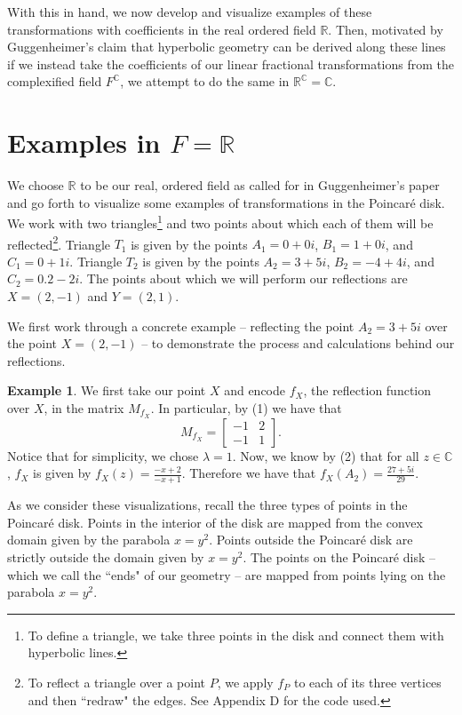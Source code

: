 \documentclass[12pt]{article}
\newcommand{\R}{\mathbb{R}}
\newcommand{\C}{\mathbb{C}}
\newcommand{\fc}{F^{\C}}
\newcommand{\lftmat}[4]{\begin{bmatrix} {#1} & {#2} \\ {#3} & {#4} \end{bmatrix}}
\newcommand{\poincare}{Poincar\'{e} }
\theoremstyle{plain}
\theoremstyle{definition}
\newtheorem{example}[definition]{Example}
\newcommand{\todo}[1]{\color{magenta} \text{{#1}} \color{black}}
\begin{document}
With this in hand, we now develop and visualize examples of these transformations with coefficients in the real ordered field $\R$. Then, motivated by Guggenheimer's claim that hyperbolic geometry can be derived along these lines if we instead take the coefficients of our linear fractional transformations from the complexified field $\fc$, we attempt to do the same in $\R^{\C} = \C$. 



\section{Examples in $F = \R$}

\hspace{10mm} We choose $\R$ to be our real, ordered field as called for in Guggenheimer's paper and go forth to visualize some examples of transformations in the \poincare disk. We work with two triangles\footnote{To define a triangle, we take three points in the disk and connect them with hyperbolic lines.} and two points about which each of them will be reflected\footnote{To reflect a triangle over a point $P$, we apply $f_P$ to each of its three vertices and then ``redraw" the edges. See Appendix D for the code used. \todo{probably change}}. Triangle $T_1$ is given by the points $A_1 = 0 + 0i$, $B_1 = 1 + 0i$, and $C_1 = 0 + 1i$. Triangle $T_2$ is given by the points $A_2 = 3 + 5i$, $B_2 = -4 + 4i$, and $C_2 = 0.2 - 2i$. The points about which we will perform our reflections are $X = (2, -1)$ and $Y = (2, 1)$.

We first work through a concrete example -- reflecting the point $A_2 = 3+5i$ over the point $X = (2, -1)$ -- to demonstrate the process and calculations behind our reflections.

\begin{example}
We first take our point $X$ and encode $f_X$, the reflection function over $X$, in the matrix $M_{f_X}$. In particular, by (1) we have that 
\[M_{f_X} = \lftmat{-1}{2}{-1}{1}.\]
Notice that for simplicity, we chose $\lambda = 1$. Now, we know by (2) that for all $z \in \C$, $f_X$ is given by $f_X(z) = \frac{-x+2}{-x+1}$. Therefore we have that $f_X(A_2) = \frac{27+5i}{29}$. \todo{[LG] now what?}
\end{example}

As we consider these visualizations, recall the three types of points in the \poincare disk. Points in the interior of the disk are mapped from the convex domain given by the parabola $x = y^2$. Points outside the \poincare disk are strictly outside the domain given by $x = y^2$. The points on the \poincare disk -- which we call the ``ends" of our geometry -- are mapped from points lying on the parabola $x=y^2$.
\end{document}
